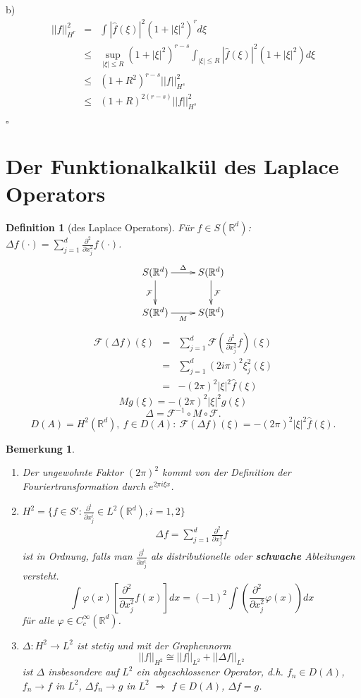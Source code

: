 \documentclass[11pt,a4paper,titlepage, ngerman]{scrartcl}
\newtheorem{Definition}[Satz]{Definition}
\newtheorem{Bemerkung}[Satz]{Bemerkung}
\numberwithin{equation}{section}
\newcommand{\R}{\mathbb{R}} %
\newcommand{\f}{\hat{f}}
\newcommand{\F}{\mathcal{F}}
\newcommand{\m}{\cdot}
\newcommand{\qed}{\begin{flushright}
		$\square$
	\end{flushright}}
\begin{document}
	b) 
	\begin{eqnarray}
		||f||_{H^r}^2 &=& \int |\f(\xi)|^2(1+|\xi|^2)^rd\xi\nonumber\\
		&\leq& \sup_{|\xi|\leq R}(1+|\xi|^2)^{r-s}\int_{|\xi|\leq R}|\f(\xi)|^2(1+|\xi|^2)d\xi\nonumber\\
		&\leq& (1+R^2)^{r-s}||f||_{H^s}^2\nonumber\\
		&\leq& (1+R)^{2(r-s)}||f||_{H^s}^2\nonumber
	\end{eqnarray}
	\qed
	
	
	\section{Der Funktionalkalkül des Laplace Operators}
	
	\begin{Definition}[des Laplace Operators]
		Für $f\in S(\R^d)$: $\Delta f(\m)=\sum_{j = 1}^{d}\frac{\partial^2}{\partial x_j^2} f(\m)$. 
		$$\xymatrix{
			S(\R^d)\ar[r]^{\Delta}\ar[d]_{\F} & S(\R^d)\ar[d]^{\F}\\
			S(\R^d)\ar[r]_M & S(\R^d)
			}$$
		\begin{eqnarray}
			\F(\Delta f)(\xi) &=& \sum_{j = 1}^{d}\F(\frac{\partial^2}{\partial x_j^2}f)(\xi) \nonumber\\
			&=& \sum_{j = 1}^d (2i\pi)^2\xi_j^2 (\xi)\nonumber\\
			&=& -(2\pi)^2 |\xi|^2 \f(\xi)\nonumber
		\end{eqnarray}
		$$Mg(\xi) = -(2\pi)^2|\xi|^2 g(\xi)$$
		$$\boxed{\Delta= \F^{-1}\circ M\circ \F.}$$
		$$D(A) = H^2(\R^d),~ f\in D(A):~ \F(\Delta f)(\xi) = -(2\pi)^2|\xi|^2\f(\xi).$$
	\end{Definition}
	
	\begin{Bemerkung}
		~
		\begin{enumerate}
			\item[a)] Der ungewohnte Faktor $(2\pi)^2$ kommt von der Definition der Fouriertransformation durch $e^{\underline{2\pi}i\xi x}$.
			\item[b)] $H^2 = \{f\in S': \frac{\partial^i}{\partial x_j^i}\in L^2(\R^d), i=1,2 \}$
			\begin{eqnarray}
				\Delta f = \sum_{j = 1}^d \frac{\partial^2}{\partial x_j^2} f\nonumber
			\end{eqnarray}
			ist in Ordnung, falls man $\frac{\partial^i}{\partial x_j^i}$ als distributionelle oder \textbf{schwache} Ableitungen versteht. 
			$$\int \varphi(x)\left[\frac{\partial^2}{\partial x_j^2} f(x)\right]dx = (-1)^{2}\int\left(\frac{\partial^2}{\partial x_j^2} \varphi(x) \right)dx$$
			für alle $\varphi\in C_c^\infty(\R^d)$.
			\item[c)] $\Delta: H^2\rightarrow L^2$ ist stetig und mit der Graphennorm
			$$||f||_{H^2}\cong ||f||_{L^2} + ||\Delta f||_{L^2}$$
			ist $\Delta$ insbesondere auf $L^2$ ein abgeschlossener Operator, d.h. $f_n\in D(A)$, $f_n\rightarrow f$ in $L^2$, $\Delta f_n\rightarrow g$ in $L^2$ $\Rightarrow$ $f\in D(A)$, $\Delta f = g$.
		\end{enumerate}
	\end{Bemerkung}
	
\end{document}
